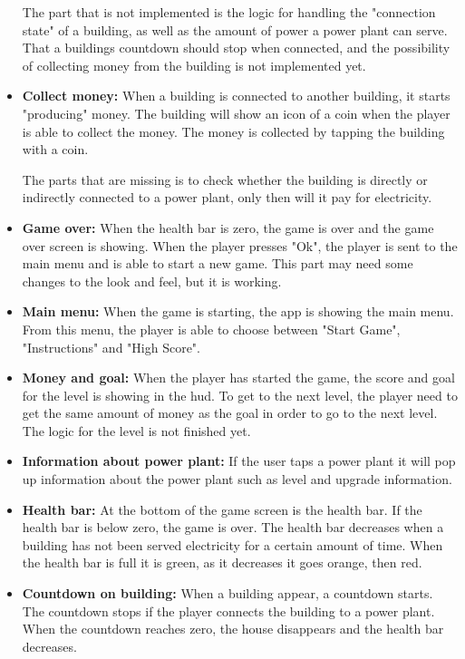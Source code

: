 \begin{itemize}
		The part that is not implemented is the logic for handling the "connection state" of a building, 
		as well as the amount of power a power plant can serve. That a buildings countdown should stop when 
		connected, and the possibility of collecting money from the building is not implemented yet.

		\item {\bf Collect money:} When a building is connected to another building, it starts 
		"producing" money. The building will show an icon of a coin when the player is able to 
		collect the money. The money is collected by tapping the building with a coin. 

		The parts that are missing is to check whether the building is directly or indirectly connected 
		to a power plant, only then will it pay for electricity.

		\item {\bf Game over:} When the health bar is zero, the game is over and the game over screen 
		is showing. When the player presses "Ok", the player is sent to the main menu and is able to 
		start a new game. This part may need some changes to the look and feel, but it is working.

		\item {\bf Main menu:} When the game is starting, the app is showing the main menu. 
		From this menu, the player is able to choose between "Start Game", "Instructions" and "High Score".

		\item {\bf Money and goal:} When the player has started the game, the score and goal for
		the level is showing in the hud. To get to the next level, the player need to get the same
		amount of money as the goal in order to go to the next level. The logic for the level
		is not finished yet.

		\item {\bf Information about power plant:} If the user taps a power plant it will pop up
		information about the power plant such as level and upgrade information.

		\item {\bf Health bar:} At the bottom of the game screen is the health bar. If the 
		health bar is below zero, the game is over. The health bar decreases when a building has not been 
		served electricity for a certain amount of time. When the health bar is full it is green, as it 
		decreases it goes orange, then red. 

		\item {\bf Countdown on building:} When a building appear, a countdown starts. The countdown stops 
		if the player connects the building to a power plant. When the countdown reaches zero, the house 
		disappears and the health bar decreases.

	\end{itemize}

